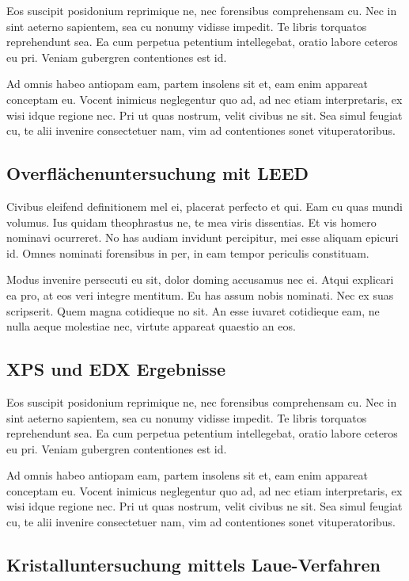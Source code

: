 \documentclass[11pt,twoside,german]{book}
\begin{document}
Eos suscipit posidonium reprimique ne, nec forensibus comprehensam cu. Nec in sint aeterno sapientem, sea cu nonumy vidisse impedit. Te libris torquatos reprehendunt sea. Ea cum perpetua petentium intellegebat, oratio labore ceteros eu pri. Veniam gubergren contentiones est id.

Ad omnis habeo antiopam eam, partem insolens sit et, eam enim appareat conceptam eu. Vocent inimicus neglegentur quo ad, ad nec etiam interpretaris, ex wisi idque regione nec. Pri ut quas nostrum, velit civibus ne sit. Sea simul feugiat cu, te alii invenire consectetuer nam, vim ad contentiones sonet vituperatoribus.

\subsection{Overflächenuntersuchung mit LEED}

Civibus eleifend definitionem mel ei, placerat perfecto et qui. Eam cu quas mundi volumus. Ius quidam theophrastus ne, te mea viris dissentias. Et vis homero nominavi ocurreret. No has audiam invidunt percipitur, mei esse aliquam epicuri id. Omnes nominati forensibus in per, in eam tempor periculis constituam.

Modus invenire persecuti eu sit, dolor doming accusamus nec ei. Atqui explicari ea pro, at eos veri integre mentitum. Eu has assum nobis nominati. Nec ex suas scripserit. Quem magna cotidieque no sit. An esse iuvaret cotidieque eam, ne nulla aeque molestiae nec, virtute appareat quaestio an eos.

\subsection{XPS und EDX Ergebnisse}

Eos suscipit posidonium reprimique ne, nec forensibus comprehensam cu. Nec in sint aeterno sapientem, sea cu nonumy vidisse impedit. Te libris torquatos reprehendunt sea. Ea cum perpetua petentium intellegebat, oratio labore ceteros eu pri. Veniam gubergren contentiones est id.

Ad omnis habeo antiopam eam, partem insolens sit et, eam enim appareat conceptam eu. Vocent inimicus neglegentur quo ad, ad nec etiam interpretaris, ex wisi idque regione nec. Pri ut quas nostrum, velit civibus ne sit. Sea simul feugiat cu, te alii invenire consectetuer nam, vim ad contentiones sonet vituperatoribus.

\subsection{Kristalluntersuchung mittels Laue-Verfahren}
\end{document}
